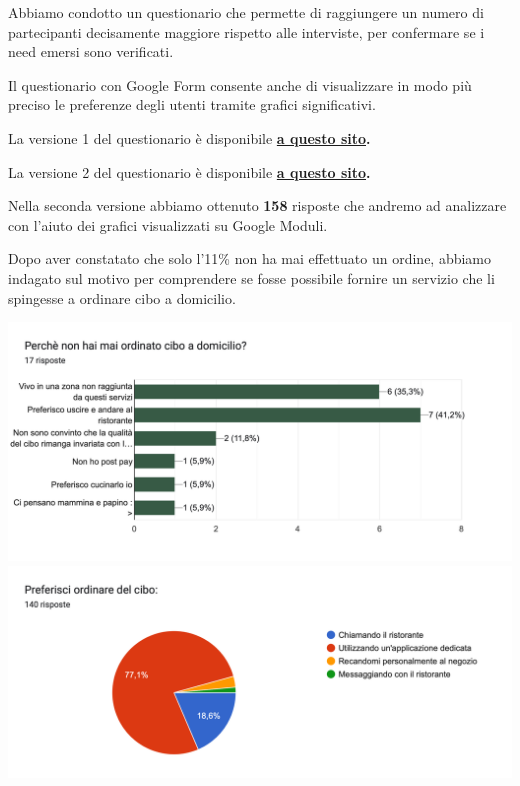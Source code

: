 \documentclass{article}
\begin{document}
    \vspace{2cm} \par 
    \vspace{0.5cm}
\par Abbiamo condotto un questionario che permette di raggiungere un numero di partecipanti decisamente maggiore rispetto alle interviste, per confermare se i need emersi sono verificati.\par Il questionario con Google Form consente anche di visualizzare in modo più preciso le preferenze degli utenti tramite grafici significativi.
\par La versione 1 del questionario è disponibile \textbf{\href{https://forms.gle/pBWCBfAxsjULCZRj6}{a questo sito}.}
\par La versione 2 del questionario è disponibile \textbf{\href{https://docs.google.com/forms/d/1ToAwRVi9a8q0_68hbEI7O8ORtodt_uTHuwU9ZtPfk1Q/edit}{a questo sito}.}
\par \vspace{1cm}
Nella seconda versione abbiamo ottenuto \textbf{158} risposte che andremo ad analizzare con l'aiuto dei grafici visualizzati su Google Moduli.\par \vspace{1cm}
\par Dopo aver constatato che solo l'11\% non ha mai effettuato un ordine, abbiamo indagato sul motivo per comprendere se fosse possibile fornire un servizio che li spingesse a ordinare cibo a domicilio.
\vspace{0.5cm}
\par 
\includegraphics[width=\textwidth]{Data/Grafici/Perche_non_ordina.png}
\includegraphics[width=\textwidth]{Data/Grafici/ordinare_cibo.png}
\end{document}
